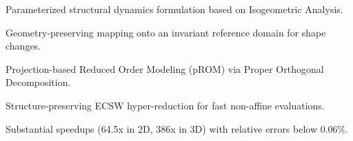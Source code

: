 \begin{highlights}
\item Parameterized structural dynamics formulation based on Isogeometric Analysis.
\item Geometry-preserving mapping onto an invariant reference domain for shape changes.
\item Projection-based Reduced Order Modeling (pROM) via Proper Orthogonal Decomposition.
\item Structure-preserving ECSW hyper-reduction for fast non-affine evaluations.
\item Substantial speedups (64.5x in 2D, 386x in 3D) with relative errors below 0.06\%.
\end{highlights}
